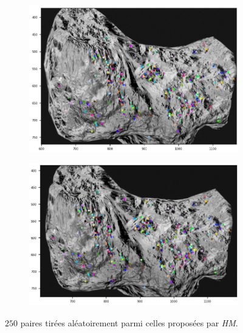 \documentclass[
	a4paper, %
	10pt, %
	unnumberedsections, %
	twoside, %
]{LTJournalArticle}
\begin{document}
\begin{figure}
	\centering
	\begin{subfigure}[H]{\columnwidth}
		\centering
		\includegraphics[width=\textwidth]{images/res1_g.png}
	\end{subfigure}

	\begin{subfigure}[H]{\columnwidth}
		\centering
		\includegraphics[width=\textwidth]{images/res1_d.png}
	\end{subfigure}
	\caption{$250$ paires tirées aléatoirement parmi celles proposées par \textit{HM}.}
	\label{figure:fig_syn}
\end{figure}
\end{document}
